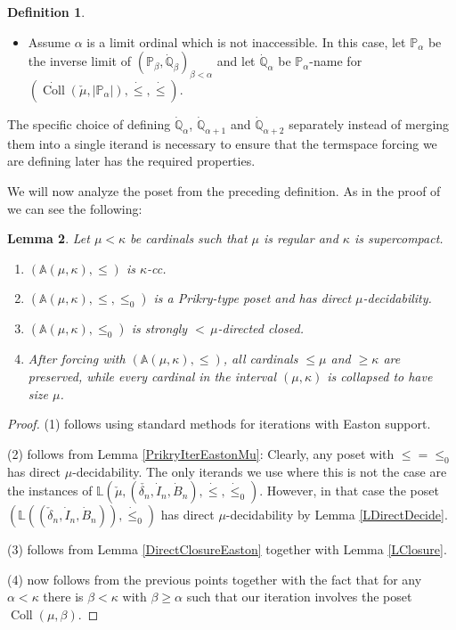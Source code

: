\documentclass[a4paper]{amsart}
\theoremstyle{definition}
\newtheorem{mydef}{Definition}[section]
\theoremstyle{remark}
\theoremstyle{plain}
\newtheorem{mylem}[mydef]{Lemma}
\numberwithin{mydef}{section}
\DeclareMathOperator{\Coll}{Coll}
\newcommand{\dA}{\mathbb{A}}
\newcommand{\dL}{\mathbb{L}}
\newcommand{\dP}{\mathbb{P}}
\newcommand{\dQ}{\mathbb{Q}}
\begin{document}
\begin{mydef}
\begin{itemize}
\begin{itemize}
				\item[Case 1.2:] Assume $l(\alpha)=\dot{\dQ}$, where $\dot{\dQ}$ is a $\dP_{\alpha}$-name for a strongly ${<}\,\alpha$-directed closed poset. In this case, we let $\dot{\dQ}_{\alpha}:=l(\alpha)$.
			\end{itemize}
			\item[Case 2:] Assume $\alpha$ is a limit ordinal which is not inaccessible. In this case, let $\dP_{\alpha}$ be the inverse limit of $(\dP_{\beta},\dot{\dQ}_{\beta})_{\beta<\alpha}$ and let $\dot{\dQ}_{\alpha}$ be $\dP_{\alpha}$-name for $(\dot{\Coll}(\check{\mu},|\dP_{\alpha}|),\dot{\leq},\dot{\leq})$.
		\end{itemize}
	\end{mydef}
	
	The specific choice of defining $\dot{\dQ}_{\alpha}$, $\dot{\dQ}_{\alpha+1}$ and $\dot{\dQ}_{\alpha+2}$ separately instead of merging them into a single iterand is necessary to ensure that the termspace forcing we are defining later has the required properties.
	
	We will now analyze the poset from the preceding definition. As in the proof of \cite[Theorem 5.3]{JakobLevineFailureApproachability} we can see the following:
	
	\begin{mylem}\label{AProperties}
		Let $\mu<\kappa$ be cardinals such that $\mu$ is regular and $\kappa$ is supercompact.
		\begin{enumerate}
			\item $(\dA(\mu,\kappa),\leq)$ is $\kappa$-cc.
			\item $(\dA(\mu,\kappa),\leq,\leq_0)$ is a Prikry-type poset and has direct $\mu$-decidability.
			\item $(\dA(\mu,\kappa),\leq_0)$ is strongly ${<}\,\mu$-directed closed.
			\item After forcing with $(\dA(\mu,\kappa),\leq)$, all cardinals $\leq\mu$ and $\geq\kappa$ are preserved, while every cardinal in the interval $(\mu,\kappa)$ is collapsed to have size $\mu$.
		\end{enumerate}
	\end{mylem}
	
	\begin{proof}
		(1) follows using standard methods for iterations with Easton support.
		
		(2) follows from Lemma \ref{PrikryIterEastonMu}: Clearly, any poset with $\leq=\leq_0$ has direct $\mu$-decidability. The only iterands we use where this is not the case are the instances of $\dL(\check{\mu},(\check{\delta_n},\dot{I}_n,\dot{B}_n),\dot{\leq},\dot{\leq}_0)$. However, in that case the poset $(\dL((\check{\delta}_n,\dot{I}_n,\dot{B}_n)),\dot{\leq}_0)$ has direct $\mu$-decidability by Lemma \ref{LDirectDecide}.
		
		(3) follows from Lemma \ref{DirectClosureEaston} together with Lemma \ref{LClosure}.
		
		(4) now follows from the previous points together with the fact that for any $\alpha<\kappa$ there is $\beta<\kappa$ with $\beta\geq\alpha$ such that our iteration involves the poset $\Coll(\mu,\beta)$.
	\end{proof}
	
\end{document}
